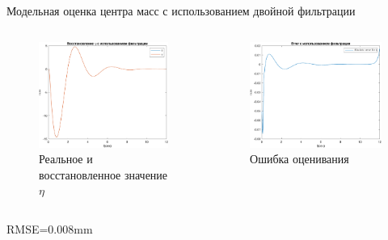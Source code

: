 \documentclass[10pt]{beamer}
\begin{document}
\begin{frame}{Модельная оценка центра масс с использованием двойной фильтрации}
	\begin{columns}
		\begin{figure}[h!]
			\includegraphics[width=1\linewidth]{images/eta_after_filtering.png}
			\caption{Реальное и восстановленное значение $\eta$}
		\end{figure}
		\begin{figure}[h!]
			\includegraphics[width=1\linewidth]{images/error_efter_filtering.png}
			\caption{Ошибка оценивания}
		\end{figure}
	\end{columns}
RMSE=0.008mm
\end{frame}
\end{document}
